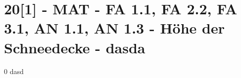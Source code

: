 \section{20[1] - MAT - FA 1.1, FA 2.2, FA 3.1, AN 1.1, AN 1.3 - Höhe der Schneedecke - dasda}

\begin{langesbeispiel}\item[0] %
dasd

\end{langesbeispiel}